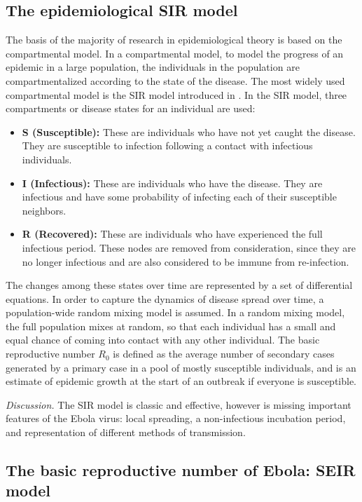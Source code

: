 \documentclass[10pt, journal,onecolumn]{IEEEtran}
\begin{document}
\subsection{\textbf{The epidemiological SIR model \citep{very_old_paper}}}
\label{SubSec:SIR}

The basis of the majority of research in epidemiological theory is based on the compartmental model.
In a compartmental model, to model the progress of an epidemic in a large population, the
individuals in the population are compartmentalized according to the state of the disease. The most
widely used compartmental model is the SIR model introduced in \citep{very_old_paper}. In the SIR model,
three compartments or disease states for an individual are used:

\begin{itemize}
\item \textbf{S (Susceptible):} These are individuals who have not yet caught the disease. They are
  susceptible to infection following a contact with infectious individuals.
\item \textbf{I (Infectious):} These are individuals who have the disease. They are infectious and
  have some probability of infecting each of their susceptible neighbors.
\item \textbf{R (Recovered):} These are individuals who have experienced the full infectious period.
  These nodes are removed from consideration, since they are no longer infectious and are also
  considered to be immune from re-infection.
\end{itemize}

The changes among these states over time are represented by a set of differential equations. In
order to capture the dynamics of disease spread over time, a population-wide random mixing model is
assumed. In a random mixing model, the full population mixes at random, so that each individual has a small
and equal chance of coming into contact with any other individual. The basic reproductive number $R_0$
is defined as the average number of secondary cases generated by a primary case in a pool of mostly
susceptible individuals, and is an estimate of epidemic growth at the start of an outbreak if
everyone is susceptible.

\textit{Discussion.} The SIR model is classic and effective, however is missing important features
of the Ebola virus: local spreading, a non-infectious incubation period, and
representation of different methods of transmission.

\subsection{\textbf{The basic reproductive number of Ebola: SEIR model \citep{chowell2004basic}}}
\end{document}
